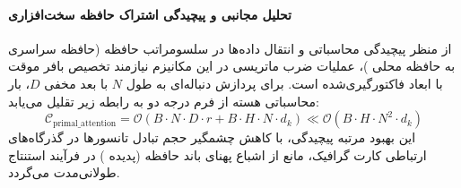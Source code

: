 \paragraph{تحلیل مجانبی و پیچیدگی اشتراک حافظه سخت‌افزاری}
از منظر پیچیدگی محاسباتی و انتقال داده‌ها در سلسومراتب حافظه (حافظه سراسری  به حافظه محلی )، عملیات ضرب ماتریسی در این مکانیزم نیازمند تخصیص بافر موقت با ابعاد فاکتورگیری‌شده است. برای پردازش دنباله‌ای به طول $N$ با بعد مخفی $D$، بار محاسباتی هسته از فرم درجه دو به رابطه زیر تقلیل می‌یابد:
\begin{equation}
\label{eq:complexity_primal_attention}
\mathcal{C}_{\text{primal\_attention}} = \mathcal{O}\left( B \cdot N \cdot D \cdot r + B \cdot H \cdot N \cdot d_k \right) \ll \mathcal{O}\left( B \cdot H \cdot N^2 \cdot d_k \right)
\end{equation}
این بهبود مرتبه پیچیدگی، با کاهش چشمگیر حجم تبادل تانسورها در گذرگاه‌های ارتباطی کارت گرافیک، مانع از اشباع پهنای باند حافظه (پدیده ) در فرآیند استنتاج طولانی‌مدت می‌گردد.